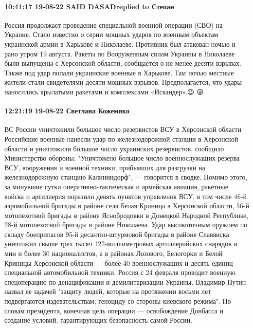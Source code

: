 \paragraph{10:41:17 19-08-22 SAID DASADreplied to Степан}

Россия продолжает проведение специальной военной операции (СВО) на Украине.
Стало известно о серии мощных ударов по военным объектам украинской армии в
Харькове и Николаеве. Противник был атакован ночью и рано утром 19 августа.
Ракеты по Вооруженным силам Украины в Николаеве были выпущены с Херсонской
области, сообщается о не менее десяти взрывах. Также под удар попали украинские
военные в Харькове. Там ночью местные жители стали свидетелями десяти мощных
взрывов. Предполагается, что удары наносились крылатыми ракетами и комплексами
«Искандер».😉 😜

\paragraph{12:21:19 19-08-22 Светлана Кожемяко}

ВС России уничтожили большое число резервистов ВСУ в Херсонской области
Российские военные нанесли удар по железнодорожной станции в Херсонской области и уничтожили большое число украинских резервистов, сообщило Министерство обороны.
"Уничтожено большое число военнослужащих резерва ВСУ, вооружения и военной техники, прибывших для разгрузки на железнодорожную станцию Калининдорф", — говорится в сводке.
Помимо этого, за минувшие сутки оперативно-тактическая и армейская авиация, ракетные войска и артиллерия поразили девять пунктов управления ВСУ, в том числе 46-й аэромобильной бригады в районе села Белая Криница в Херсонской области, 56-й мотопехотной бригады в районе Яснобродовки в Донецкой Народной Республике, 28-й мотопехотной бригады в районе Николаева.
Удар высокоточным оружием по складу боеприпасов 95-й десантно-штурмовой бригады в районе Славянска уничтожил свыше трех тысяч 122-миллиметровых артиллерийских снарядов и мин и более 30 националистов, а в районах Лозового, Белогорки и Белой Криницы Херсонской области — более 40 военнослужащих и десять единиц специальной автомобильной техники.
Россия с 24 февраля проводит военную спецоперацию по денацификации и демилитаризации Украины. Владимир Путин назвал ее задачей "защиту людей, которые на протяжении восьми лет подвергаются издевательствам, геноциду со стороны киевского режима". По словам президента, конечная цель операции — освобождение Донбасса и создание условий, гарантирующих безопасность самой России.

